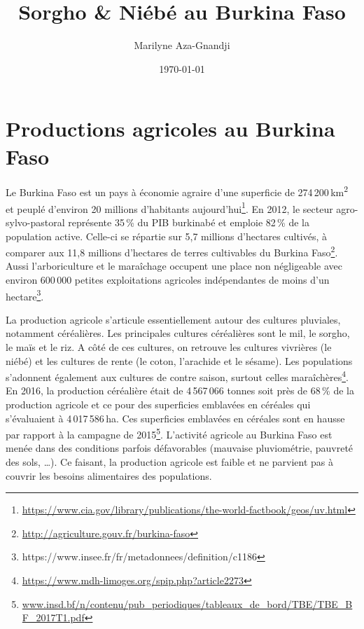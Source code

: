 \documentclass[a4paper,11pt]{article}
\begin{document}
\title{Sorgho \& Niébé au Burkina Faso}
\author{Marilyne Aza-Gnandji}
\date{\today}

\maketitle
\tableofcontents

\section{Productions agricoles au Burkina Faso}

Le Burkina Faso est un pays à économie agraire
\cite{Koulibi_FideleZONGO} d'une superficie de
274\,200\,km\textsuperscript{2} et peuplé d'environ 20 millions
d'habitants
aujourd'hui\footnote{\url{https://www.cia.gov/library/publications/the-world-factbook/geos/uv.html}}. En
2012, le secteur agro-sylvo-pastoral représente 35\,\% du PIB
burkinabé et emploie 82\,\% de la population active. Celle-ci se
répartie sur 5,7 millions d'hectares cultivés, à comparer aux 11,8
millions d'hectares de terres cultivables du Burkina
Faso\footnote{\url{http://agriculture.gouv.fr/burkina-faso}}. Aussi
l'arboriculture et le maraîchage occupent une place non négligeable
avec environ 600\,000 petites exploitations agricoles indépendantes de
moins d'un
hectare\footnote{https://www.insee.fr/fr/metadonnees/definition/c1186}.

La production agricole s'articule essentiellement autour des cultures
pluviales, notamment céréalières. Les principales cultures céréalières
sont le mil, le sorgho, le maïs et le riz. A côté de ces cultures, on
retrouve les cultures vivrières (le niébé) et les cultures de rente
(le coton, l'arachide et le sésame). Les populations s'adonnent
également aux cultures de contre saison, surtout celles
maraîchères\footnote{\url{https://www.mdh-limoges.org/spip.php?article2273}}.
En 2016, la production céréalière était de 4\,567\,066 tonnes soit
près de 68\,\% de la production agricole et ce pour des superficies
emblavées en céréales qui s'évaluaient à 4\,017\,586\,ha. Ces
superficies emblavées en céréales sont en hausse par rapport à la
campagne de
2015\footnote{\url{www.insd.bf/n/contenu/pub_periodiques/tableaux_de_bord/TBE/TBE_BF_2017T1.pdf}}. L'activité
agricole au Burkina Faso est menée dans des conditions parfois
défavorables (mauvaise pluviométrie, pauvreté des sols, \ldots{}). Ce
faisant, la production agricole est faible et ne parvient pas à
couvrir les besoins alimentaires des populations.
\end{document}
